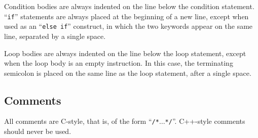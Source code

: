 Condition bodies are always indented on the line below the condition
statement. ``\texttt{if}'' statements are always placed at the beginning
of a new line, except when used as an ``\texttt{else~if}''
construct, in which the two keywords appear on the same line,
separated by a single space.

Loop bodies are always indented on the line below the loop statement,
except when the loop body is an empty instruction. In this case, the
terminating semicolon is placed on the same line as the loop
statement, after a single space.

\subsection{Comments}

All comments are C-style, that is, of the form
``\texttt{/*}$\ldots$\texttt{*/}''. C++-style comments should never be
used.

